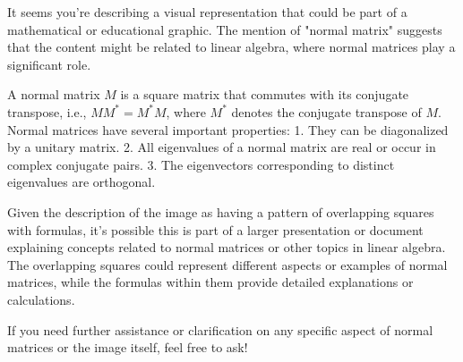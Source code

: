 It seems you're describing a visual representation that could be part of a mathematical or educational graphic. The mention of "normal matrix" suggests that the content might be related to linear algebra, where normal matrices play a significant role.

A normal matrix \( M \) is a square matrix that commutes with its conjugate transpose, i.e., \( MM^* = M^*M \), where \( M^* \) denotes the conjugate transpose of \( M \). Normal matrices have several important properties:
1. They can be diagonalized by a unitary matrix.
2. All eigenvalues of a normal matrix are real or occur in complex conjugate pairs.
3. The eigenvectors corresponding to distinct eigenvalues are orthogonal.

Given the description of the image as having a pattern of overlapping squares with formulas, it's possible this is part of a larger presentation or document explaining concepts related to normal matrices or other topics in linear algebra. The overlapping squares could represent different aspects or examples of normal matrices, while the formulas within them provide detailed explanations or calculations.

If you need further assistance or clarification on any specific aspect of normal matrices or the image itself, feel free to ask!